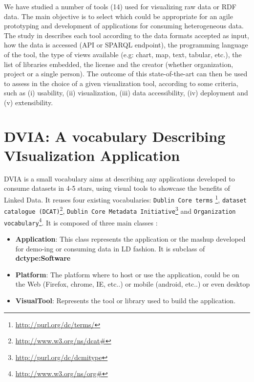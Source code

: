 \documentclass[a4paper,11pt]{report}
\begin{document}
We have studied a number of tools (14) used for visualizing raw data or RDF data. The main objective is to select which could be appropriate for an agile prototyping and development of applications for consuming heterogeneous data. 
The study in \cite{deliverable2012b} describes each tool according to the data formats accepted as input, how the data is accessed (API or SPARQL endpoint), the programming language of the tool, the type of views available (e.g: chart, map, text, tabular, etc.), the list of libraries embedded, the license and the creator (whether organization, project or a single person). The outcome of this state-of-the-art can then be used to assess in the choice of a given visualization tool, according to some criteria, such as (i) usability, (ii) visualization, (iii) data accessibility, (iv) deployment and (v) extensibility. 



\section{DVIA: A vocabulary   Describing VIsualization Application}
DVIA is a small vocabulary aims at describing any applications developed to consume datasets in 4-5 stars, using visual tools to showcase the benefits of Linked Data. It reuses four existing vocabularies: \texttt{Dublin Core terms} \footnote{\url{http://purl.org/dc/terms/}}, \texttt{dataset catalogue (DCAT)}\footnote{\url{http://www.w3.org/ns/dcat#}}, \texttt{Dublin Core Metadata Initiative}\footnote{\url{http://purl.org/dc/dcmitype}} and \texttt{Organization vocabulary}\footnote{\url{http://www.w3.org/ns/org#}}.  It is composed of three main classes : 

\begin{itemize}
\item \textbf{Application}: This class represents the application or the mashup developed for demo-ing or consuming data in LD fashion. It is subclass of \textbf{dctype:Software}
\item \textbf{Platform}: The platform where to host or use the application, could be on the Web (Firefox, chrome, IE, etc..) or mobile (android, etc..) or even desktop
\item \textbf{VisualTool}: Represents the tool or library used to build the application. 
\end{itemize}
\end{document}

